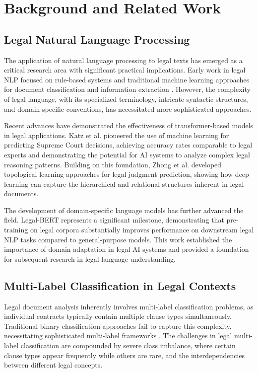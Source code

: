 \section{Background and Related Work}

\subsection{Legal Natural Language Processing}

The application of natural language processing to legal texts has emerged as a critical research area with significant practical implications. Early work in legal NLP focused on rule-based systems and traditional machine learning approaches for document classification and information extraction \cite{sulea2017exploring}. However, the complexity of legal language, with its specialized terminology, intricate syntactic structures, and domain-specific conventions, has necessitated more sophisticated approaches.

Recent advances have demonstrated the effectiveness of transformer-based models in legal applications. Katz et al. \cite{katz2017general} pioneered the use of machine learning for predicting Supreme Court decisions, achieving accuracy rates comparable to legal experts and demonstrating the potential for AI systems to analyze complex legal reasoning patterns. Building on this foundation, Zhong et al. \cite{zhong2018legal} developed topological learning approaches for legal judgment prediction, showing how deep learning can capture the hierarchical and relational structures inherent in legal documents.

The development of domain-specific language models has further advanced the field. Legal-BERT \cite{chalkidis2020legal} represents a significant milestone, demonstrating that pre-training on legal corpora substantially improves performance on downstream legal NLP tasks compared to general-purpose models. This work established the importance of domain adaptation in legal AI systems and provided a foundation for subsequent research in legal language understanding.

\subsection{Multi-Label Classification in Legal Contexts}

Legal document analysis inherently involves multi-label classification problems, as individual contracts typically contain multiple clause types simultaneously. Traditional binary classification approaches fail to capture this complexity, necessitating sophisticated multi-label frameworks \cite{liu2021multilabel}. The challenges in legal multi-label classification are compounded by severe class imbalance, where certain clause types appear frequently while others are rare, and the interdependencies between different legal concepts.

